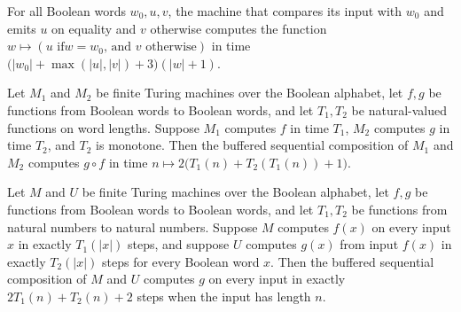 \begin{theorem}
\label{Turing.FinTM.ifEqTM_computes}
\leanok
{}
For all Boolean words $w_0,u,v$, the machine that compares its input with $w_0$ and
emits $u$ on equality and $v$ otherwise computes the function $w\mapsto (u\text{ if
}w=w_0\text{, and }v\text{ otherwise})$ in time
$\bigl(|w_0|+\max(|u|,|v|)+3\bigr)(|w|+1)$.
\end{theorem}

\begin{theorem}
\label{Turing.FinTM.bufferedCompTM_computesFunInTime}
\leanok
{}
Let $M_1$ and $M_2$ be finite Turing machines over the Boolean alphabet, let $f,g$ be
functions from Boolean words to Boolean words, and let $T_1,T_2$ be natural-valued
functions on word lengths. Suppose $M_1$ computes $f$ in time $T_1$, $M_2$ computes $g$
in time $T_2$, and $T_2$ is monotone. Then the buffered sequential composition of $M_1$
and $M_2$ computes $g \circ f$ in time $n \mapsto 2\bigl(T_1(n)+T_2(T_1(n))+1\bigr)$.
\end{theorem}

\begin{theorem}
\label{Turing.FinTM.bufferedCompTM_computesFunInTime_on_image}
\leanok
{}
Let $M$ and $U$ be finite Turing machines over the Boolean alphabet, let $f,g$ be
functions from Boolean words to Boolean words, and let $T_1,T_2$ be functions from
natural numbers to natural numbers. Suppose $M$ computes $f(x)$ on every input $x$ in
exactly $T_1(|x|)$ steps, and suppose $U$ computes $g(x)$ from input $f(x)$ in exactly
$T_2(|x|)$ steps for every Boolean word $x$. Then the buffered sequential composition of
$M$ and $U$ computes $g$ on every input in exactly $2T_1(n)+T_2(n)+2$ steps when the
input has length $n$.
\end{theorem}

